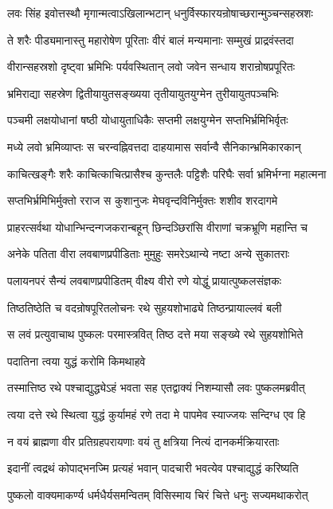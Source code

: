 \twolineshloka
{लवः सिंह इवोत्तस्थौ मृगान्मत्वाऽखिलान्भटान्}
{धनुर्विस्फारयन्रोषाच्छरान्मुञ्चन्सहस्रशः}%

\twolineshloka
{ते शरैः पीड्यमानास्तु महारोषेण पूरिताः}
{वीरं बालं मन्यमानाः सम्मुखं प्राद्रवंस्तदा}%

\twolineshloka
{वीरान्सहस्रशो दृष्ट्वा भ्रमिभिः पर्यवस्थितान्}
{लवो जवेन सन्धाय शरान्रोषप्रपूरितः}%

\twolineshloka
{भ्रमिराद्या सहस्रेण द्वितीयायुतसङ्ख्यया}
{तृतीयायुतयुग्मेन तुरीयायुतपञ्चभिः}%

\twolineshloka
{पञ्चमी लक्षयोधानां षष्ठी योधायुताधिकैः}
{सप्तमी लक्षयुग्मेन सप्तभिर्भ्रमिभिर्वृतः}%

\twolineshloka
{मध्ये लवो भ्रमिव्याप्तः स चरन्वह्निवत्तदा}
{दाहयामास सर्वान्वै सैनिकान्भ्रमिकारकान्}%

\twolineshloka
{काचित्खङ्गैः शरैः काचित्काचित्प्रासैश्च कुन्तलैः}
{पट्टिशैः परिघैः सर्वा भ्रमिर्भग्ना महात्मना}%

\twolineshloka
{सप्तभिर्भ्रमिभिर्मुक्तो रराज स कुशानुजः}
{मेघवृन्दविनिर्मुक्तः शशीव शरदागमे}%

\twolineshloka
{प्राहरत्सर्वथा योधान्भिन्दन्गजकरान्बहून्}
{छिन्दञ्छिरांसि वीराणां चक्रभ्रूणि महान्ति च}%

\twolineshloka
{अनेके पतिता वीरा लवबाणप्रपीडिताः}
{मुमुहुः समरेऽथान्ये नष्टा अन्ये सुकातराः}%

\twolineshloka
{पलायनपरं सैन्यं लवबाणप्रपीडितम्}
{वीक्ष्य वीरो रणे योद्धुं प्रायात्पुष्कलसंज्ञकः}%

\twolineshloka
{तिष्ठतिष्ठेति च वदन्रोषपूरितलोचनः}
{रथे सुहयशोभाढ्ये तिष्ठन्प्रायाल्लवं बली}%

\twolineshloka
{स लवं प्रत्युवाचाथ पुष्कलः परमास्त्रवित्}
{तिष्ठ दत्ते मया सङ्ख्ये रथे सुहयशोभिते}%

पदातिना त्वया युद्धं करोमि किमथाहवे

\twolineshloka
{तस्मात्तिष्ठ रथे पश्चाद्युद्ध्येऽहं भवता सह}
{एतद्वाक्यं निशम्यासौ लवः पुष्कलमब्रवीत्}%

\twolineshloka
{त्वया दत्ते रथे स्थित्वा युद्धं कुर्यामहं रणे}
{तदा मे पापमेव स्याज्जयः सन्दिग्ध एव हि}%

\twolineshloka
{न वयं ब्राह्मणा वीर प्रतिग्रहपरायणाः}
{वयं तु क्षत्रिया नित्यं दानकर्मक्रियारताः}%

\twolineshloka
{इदानीं त्वद्रथं कोपाद्भनज्मि प्रत्यहं भवान्}
{पादचारी भवत्येव पश्चाद्युद्धं करिष्यति}%

\twolineshloka
{पुष्कलो वाक्यमाकर्ण्य धर्मधैर्यसमन्वितम्}
{विसिस्माय चिरं चित्ते धनुः सज्यमथाकरोत्}%

